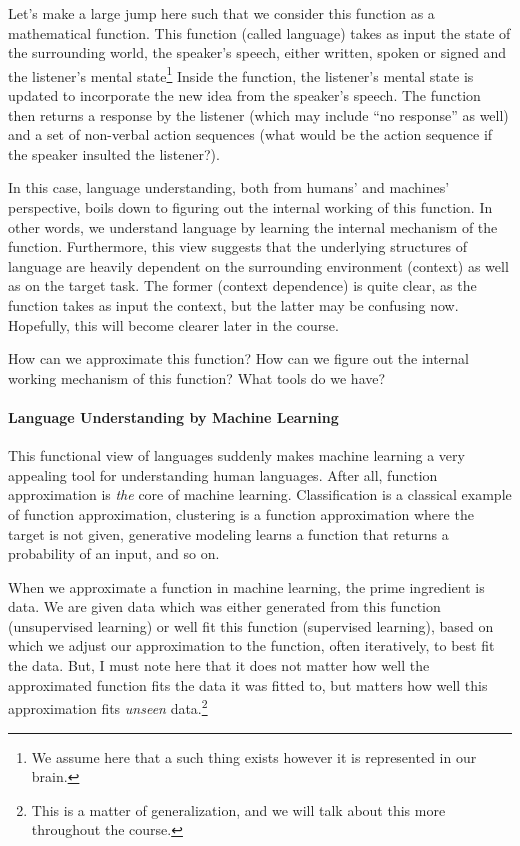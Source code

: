 \documentclass{report}
\begin{document}
Let's make a large jump here such that we consider this function as a
mathematical function.  This function (called language) takes as input the state
of the surrounding world, the speaker's speech, either written, spoken or signed
and the listener's mental state\footnote{
    We assume here that a such thing exists however it is represented in
    our brain.
} Inside the function, the listener's mental state is updated to incorporate the
new idea from the speaker's speech. The function then returns a response by the
listener (which may include ``no response'' as well) and a set of non-verbal
action sequences (what would be the action sequence if the speaker insulted
the listener?).

In this case, language understanding, both from humans' and machines'
perspective, boils down to figuring out the internal working of this function.
In other words, we understand language by learning the internal mechanism of the
function.  Furthermore, this view suggests that the underlying structures of
language are heavily dependent on the surrounding environment (context) as well
as on the target task. The former (context dependence) is quite clear, as the
function takes as input the context, but the latter may be confusing now.
Hopefully, this will become clearer later in the course.

How can we approximate this function? How can we figure out the internal working
mechanism of this function? What tools do we have?

\paragraph{Language Understanding by Machine Learning}
This functional view of languages suddenly makes machine learning a very
appealing tool for understanding human languages. After all, function
approximation is {\em the} core of machine learning. Classification is a
classical example of function approximation, clustering is a function
approximation where the target is not given, generative modeling learns a
function that returns a probability of an input, and so on.

When we approximate a function in machine learning, the prime ingredient is
data. We are given data which was either generated from this function
(unsupervised learning) or well fit this function (supervised learning), based
on which we adjust our approximation to the function, often iteratively, to best
fit the data. But, I must note here that it does not matter how well the approximated
function fits the data it was fitted to, but matters how well this approximation fits
{\em unseen} data.\footnote{
    This is a matter of generalization, and we will talk
    about this more throughout the course.
}
\end{document}
